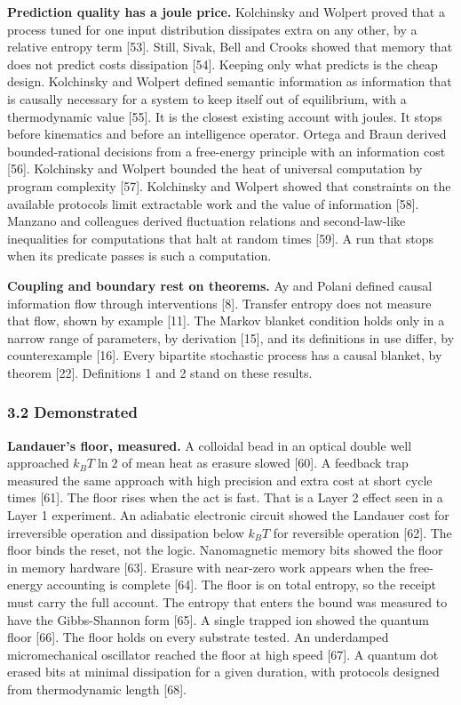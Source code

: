 \documentclass[
  10pt,
]{article}
\begin{document}
\textbf{Prediction quality has a joule price.} Kolchinsky and Wolpert
proved that a process tuned for one input distribution dissipates extra
on any other, by a relative entropy term {[}53{]}. Still, Sivak, Bell
and Crooks showed that memory that does not predict costs dissipation
{[}54{]}. Keeping only what predicts is the cheap design. Kolchinsky and
Wolpert defined semantic information as information that is causally
necessary for a system to keep itself out of equilibrium, with a
thermodynamic value {[}55{]}. It is the closest existing account with
joules. It stops before kinematics and before an intelligence operator.
Ortega and Braun derived bounded-rational decisions from a free-energy
principle with an information cost {[}56{]}. Kolchinsky and Wolpert
bounded the heat of universal computation by program complexity
{[}57{]}. Kolchinsky and Wolpert showed that constraints on the
available protocols limit extractable work and the value of information
{[}58{]}. Manzano and colleagues derived fluctuation relations and
second-law-like inequalities for computations that halt at random times
{[}59{]}. A run that stops when its predicate passes is such a
computation.

\textbf{Coupling and boundary rest on theorems.} Ay and Polani defined
causal information flow through interventions {[}8{]}. Transfer entropy
does not measure that flow, shown by example {[}11{]}. The Markov
blanket condition holds only in a narrow range of parameters, by
derivation {[}15{]}, and its definitions in use differ, by
counterexample {[}16{]}. Every bipartite stochastic process has a causal
blanket, by theorem {[}22{]}. Definitions 1 and 2 stand on these
results.

\subsubsection{3.2 Demonstrated}\label{demonstrated}

\textbf{Landauer's floor, measured.} A colloidal bead in an optical
double well approached \(k_B T \ln 2\) of mean heat as erasure slowed
{[}60{]}. A feedback trap measured the same approach with high precision
and extra cost at short cycle times {[}61{]}. The floor rises when the
act is fast. That is a Layer 2 effect seen in a Layer 1 experiment. An
adiabatic electronic circuit showed the Landauer cost for irreversible
operation and dissipation below \(k_B T\) for reversible operation
{[}62{]}. The floor binds the reset, not the logic. Nanomagnetic memory
bits showed the floor in memory hardware {[}63{]}. Erasure with
near-zero work appears when the free-energy accounting is complete
{[}64{]}. The floor is on total entropy, so the receipt must carry the
full account. The entropy that enters the bound was measured to have the
Gibbs-Shannon form {[}65{]}. A single trapped ion showed the quantum
floor {[}66{]}. The floor holds on every substrate tested. An
underdamped micromechanical oscillator reached the floor at high speed
{[}67{]}. A quantum dot erased bits at minimal dissipation for a given
duration, with protocols designed from thermodynamic length {[}68{]}.
\end{document}
